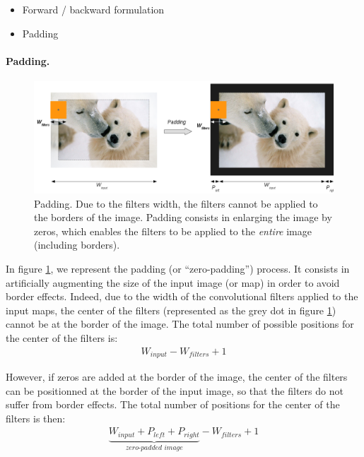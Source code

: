 \begin{itemize}
 \item Forward / backward formulation
 \item Padding
\end{itemize}


\paragraph{Padding. }

\begin{figure}
 \begin{center}
  \includegraphics[width=16cm]{images/padding.png}
 \end{center}
  \caption{
  \label{fig:padding}
  Padding. Due to the filters width, the filters cannot be applied to the borders of the image. Padding consists in enlarging the 
  image by zeros, which enables the filters to be applied to the \textit{entire} image (including borders). 
  }
\end{figure}

In figure \ref{fig:padding}, we represent the padding (or ``zero-padding'') process. It consists in artificially augmenting the size of the input 
image (or map) in order to avoid border effects. Indeed, due to the width of the convolutional filters applied to the input maps, the center of the 
filters (represented as the grey dot in figure \ref{fig:padding}) cannot be at the border of the image.
The total number of possible positions for the center of the filters is: 
\begin{align}
 W_{input} - W_{filters} + 1 \nonumber
\end{align}

However, if zeros are added at the border of the image, the center of the filters can be positionned at the border of the input image, so that the 
filters do not suffer from border effects. 
The total number of positions for the center of the filters is then: 
\begin{align}
 \underbrace{W_{input} + P_{left} + P_{right}}_{\textit{zero-padded image}} - W_{filters} + 1 \nonumber
\end{align}

